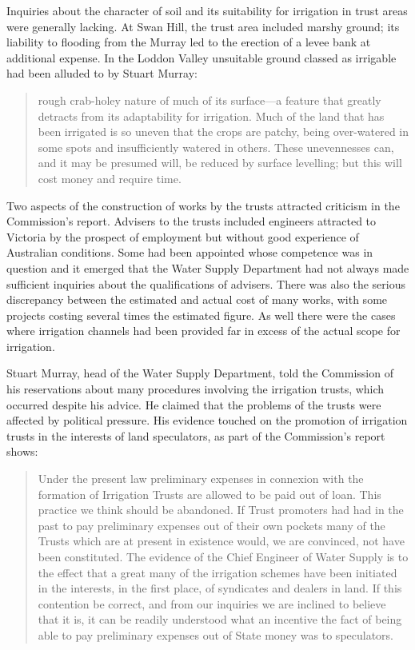 Inquiries about the character of soil and its suitability for
irrigation in trust areas were generally lacking.  At Swan Hill, the
trust area included marshy ground; its liability to flooding from the
Murray led to the erection of a levee bank at additional expense.  In
the Loddon Valley unsuitable ground classed as irrigable had been
alluded to by Stuart Murray:
\begin{quote}
	rough crab-holey nature of much of its surface---a feature
	that greatly detracts from its adaptability for irrigation.
	Much of the land that has been irrigated is so uneven that the
	crops are patchy, being over-watered in some spots and
	insufficiently watered in others.  These unevennesses can, and
	it may be presumed will, be reduced by surface levelling; but
	this will cost money and require time.
\end{quote}

Two aspects of the construction of works by the trusts attracted
criticism in the Commission's report.  Advisers to the trusts included
engineers attracted to Victoria by the prospect of employment but
without good experience of Australian conditions.  Some had been
appointed whose competence was in question and it emerged that the
Water Supply Department had not always made sufficient inquiries about
the qualifications of advisers.  There was also the serious
discrepancy between the estimated and actual cost of many works, with
some projects costing several times the estimated figure.  As well
there were the cases where irrigation channels had been provided far
in excess of the actual scope for irrigation.

Stuart Murray, head of the Water Supply Department, told the
Commission of his reservations about many procedures involving the
irrigation trusts, which occurred despite his advice.  He claimed that
the problems of the trusts were affected by political pressure.  His
evidence touched on the promotion of irrigation trusts in the
interests of land speculators, as part of the Commission's report
shows:
\begin{quote}
	Under the present law preliminary expenses in connexion with
	the formation of Irrigation Trusts are allowed to be paid out
	of loan.  This practice we think should be abandoned.  If
	Trust promoters had had in the past to pay preliminary
	expenses out of their own pockets many of the Trusts which are
	at present in existence would, we are convinced, not have been
	constituted.  The evidence of the Chief Engineer of Water
	Supply is to the effect that a great many of the irrigation
	schemes have been initiated in the interests, in the first
	place, of syndicates and dealers in land.  If this contention
	be correct, and from our inquiries we are inclined to believe
	that it is, it can be readily understood what an incentive the
	fact of being able to pay preliminary expenses out of State
	money was to speculators.
\end{quote}

